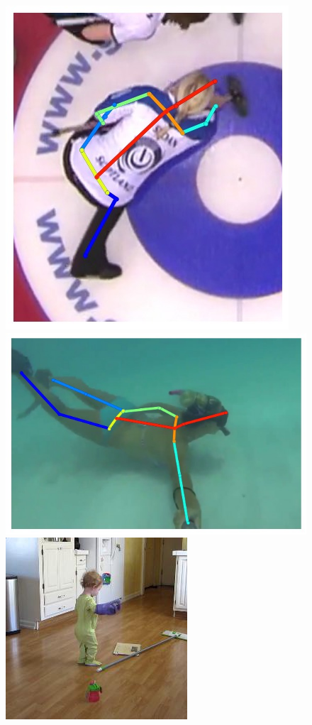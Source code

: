 \begin{figure}[t!]
    \includegraphics[height=\flowh]{Figures/pose/qualitative/pred-12}
    \hfill
    \includegraphics[height=\flowh]{Figures/pose/qualitative/pred-13}
    \\
    \newcommand{\flowhh}{0.27\columnwidth}
    \includegraphics[height=\flowhh]{Figures/pose/qualitative/view/view_img_00}

\end{figure}
